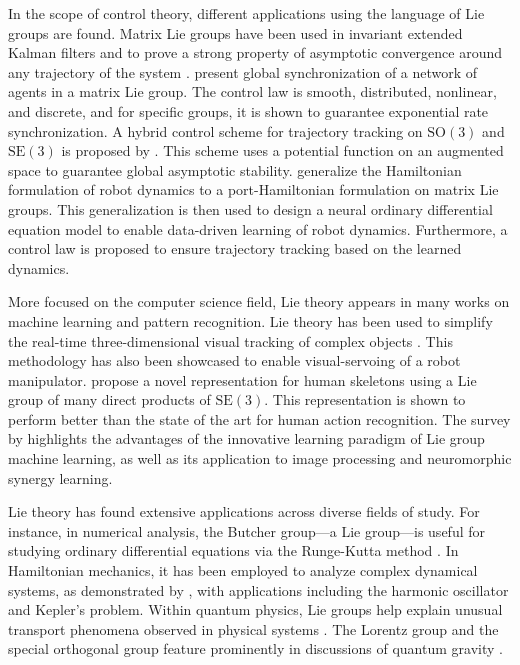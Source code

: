 In the scope of control theory, different applications using the language of Lie groups are found. Matrix Lie groups have been used in invariant extended Kalman filters and to prove a strong property of asymptotic convergence around any trajectory of the system \citep{Barrau2017}. \citet{Mccarthy2020} present global synchronization of a network of agents in a matrix Lie group. The control law is smooth, distributed, nonlinear, and discrete, and for specific groups, it is shown to guarantee exponential rate synchronization. A hybrid control scheme for trajectory tracking on $\text{SO}(3)$ and $\text{SE}(3)$ is proposed by \citet{Wang2022}. This scheme uses a potential function on an augmented space to guarantee global asymptotic stability. \citet{Duong2024} generalize the Hamiltonian formulation of robot dynamics to a port-Hamiltonian formulation on matrix Lie groups. This generalization is then used to design a neural ordinary differential equation model to enable data-driven learning of robot dynamics. Furthermore, a control law is proposed to ensure trajectory tracking based on the learned dynamics.

More focused on the computer science field, Lie theory appears in many works on machine learning and pattern recognition. Lie theory has been used to simplify the real-time three-dimensional visual tracking of complex objects \citep{Drummond2002}. This methodology has also been showcased to enable visual-servoing of a robot manipulator. \citet{Vemulapalli2014} propose a novel representation for human skeletons using a Lie group of many direct products of $\text{SE}(3)$. This representation is shown to perform better than the state of the art for human action recognition. The survey by \citet{Lu2020} highlights the advantages of the innovative learning paradigm of Lie group machine learning, as well as its application to image processing and neuromorphic synergy learning.

Lie theory has found extensive applications across diverse fields of study. For instance, in numerical analysis, the Butcher group---a Lie group---is useful for studying ordinary differential equations via the Runge-Kutta method \citep{Bogfjellmo2017}. In Hamiltonian mechanics, it has been employed to analyze complex dynamical systems, as demonstrated by \citet{Hamburger2009}, with applications including the harmonic oscillator and Kepler's problem. Within quantum physics, Lie groups help explain unusual transport phenomena observed in physical systems \citep{Ilievski2021}. The Lorentz group and the special orthogonal group feature prominently in discussions of quantum gravity \citep{Dreyer2003,Kapec2017}.
